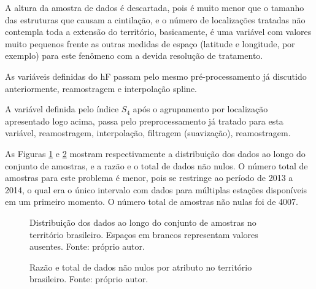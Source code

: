 A altura da amostra de dados é descartada, pois é muito menor que o tamanho das estruturas que causam a cintilação, e o número de localizações tratadas não contempla toda a extensão do território, basicamente, é uma variável com valores muito pequenos frente as outras medidas de espaço (latitude e longitude, por exemplo) para este fenômeno com a devida resolução de tratamento.

As variáveis definidas do hF passam pelo mesmo pré-processamento já discutido anteriormente, reamostragem e interpolação spline.

A variável definida pelo índice $S_4$ após o agrupamento por localização apresentado logo acima, passa pelo preprocessamento já tratado para esta variável, reamostragem, interpolação, filtragem (suavização), reamostragem.

As Figuras \ref{fig:distributionall} e \ref{fig:nulltotalall} mostram respectivamente a distribuição dos dados ao longo do conjunto de amostras, e a razão e o total de dados não nulos. O número total de amostras para este problema é menor, pois se restringe ao período de 2013 a 2014, o qual era o único intervalo com dados para múltiplas estações disponíveis em um primeiro momento. O número total de amostras não nulas foi de 4007.

\begin{figure}[H]
\centering
{}
\caption{Distribuição dos dados ao longo do conjunto de amostras no território brasileiro. Espaços em brancos representam valores ausentes. Fonte: próprio autor.}
\label{fig:distributionall}
\end{figure}

\begin{figure}[H]
\centering
{}
\caption{Razão e total de dados não nulos por atributo no território brasileiro. Fonte: próprio autor.}
\label{fig:nulltotalall}
\end{figure}

